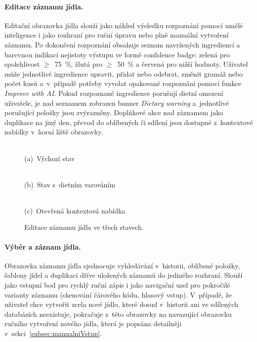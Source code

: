 \paragraph{Editace záznamu jídla.}
Editační obrazovka jídla slouží jako náhled výsledku rozpoznání pomocí umělé inteligence i jako rozhraní pro ruční úpravu nebo plně manuální vytvoření záznamu.
Po dokončení rozpoznání obsahuje seznam navržených ingrediencí a barevnou indikaci nejistoty výstupu ve formě confidence badge: zelená pro spolehlivost $\geq$~75~\%, žlutá pro $\geq$~50~\% a červená pro nižší hodnoty.
Uživatel může jednotlivé ingredience upravit, přidat nebo odebrat, změnit gramáž nebo počet kusů a~v~případě potřeby vyvolat opakované rozpoznání pomocí funkce \emph{Improve with AI}.
Pokud rozpoznané ingredience porušují dietní omezení uživatele, je nad seznamem zobrazen banner \emph{Dietary warning} a~jednotlivé porušující položky jsou zvýrazněny.
Doplňkové akce nad záznamem jako duplikace na jiný den, převod do oblíbených či sdílení jsou dostupné z~kontextové nabídky v~horní liště obrazovky.

\begin{figure}[!htb]
	\centering
	\begin{minipage}[t]{0.31\textwidth}
		\centering
		\\(a)~Výchozí stav
	\end{minipage}\hfill
	\begin{minipage}[t]{0.31\textwidth}
		\centering
		\\(b)~Stav s~dietním varováním
	\end{minipage}\hfill
	\begin{minipage}[t]{0.31\textwidth}
		\centering
		\\(c)~Otevřená kontextová nabídka
	\end{minipage}
	\caption{Editace záznamu jídla ve třech stavech.}
	\label{fig:screenEditMeal}
\end{figure}

\paragraph{Výběr a záznam jídla.}
Obrazovka záznamu jídla sjednocuje vyhledávání v~historii, oblíbené položky, šablony jídel a duplikaci dříve uložených záznamů do jediného rozhraní.
Slouží jako vstupní bod pro rychlý ruční zápis i jako navigační uzel pro pokročilé varianty záznamu (skenování čárového kódu, hlasový vstup).
V~případě, že uživatel chce vytvořit zcela nové jídlo, které dosud v~historii ani ve sdílených databázích neexistuje, pokračuje z~této obrazovky na navazující obrazovku ručního vytvoření nového jídla, která je popsána detailněji v~sekci~\ref{subsec:manualniVstup}.

